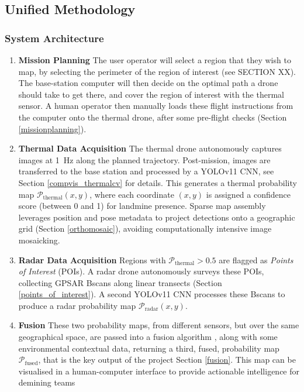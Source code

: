 \subsection{Unified Methodology} \label{compvis_methods}

\subsubsection{System Architecture}

\begin{enumerate}

    \item \textbf{Mission Planning} The user operator will select a region that they wish to map, by selecting the perimeter of the region of interest (see SECTION XX). The base-station computer will then decide on the optimal path a drone should take to get there, and cover the region of interest with the thermal sensor. A human operator then manually loads these flight instructions from the computer onto the thermal drone, after some pre-flight checks (Section \ref{missionplanning}).
    
    \item \textbf{Thermal Data Acquisition} The thermal drone autonomously captures images at 1~Hz along the planned trajectory. Post-mission, images are transferred to the base station and processed by a YOLOv11 CNN, see Section \ref{compvis_thermalcv} for details. This generates a thermal probability map \(\mathcal{P}_{\text{thermal}}(x,y)\), where each coordinate \((x,y)\) is assigned a confidence score (between 0 and 1) for landmine presence. Sparse map assembly leverages position and pose metadata to project detections onto a geographic grid  (Section \ref{orthomosaic}), avoiding computationally intensive image mosaicking.
    
    \item \textbf{Radar Data Acquisition} Regions with \(\mathcal{P}_{\text{thermal}} > 0.5\) are flagged as \textit{Points of Interest} (POIs). A radar drone autonomously surveys these POIs, collecting GPSAR Bscans along linear transects (Section \ref{points_of_interest}). A second YOLOv11 CNN processes these Bscans to produce a radar probability map \(\mathcal{P}_{\text{radar}}(x,y)\).
    
    \item \textbf{Fusion} These two probability maps, from different sensors, but over the same geographical space, are passed into a fusion algorithm , along with some environmental contextual data, returning a third, fused, probability map $\mathcal{P}_{\text{fused}}$, that is the key output of the project Section \ref{fusion}. This map can be visualised in a human-computer interface to provide actionable intelligence for demining teams
\end{enumerate}

